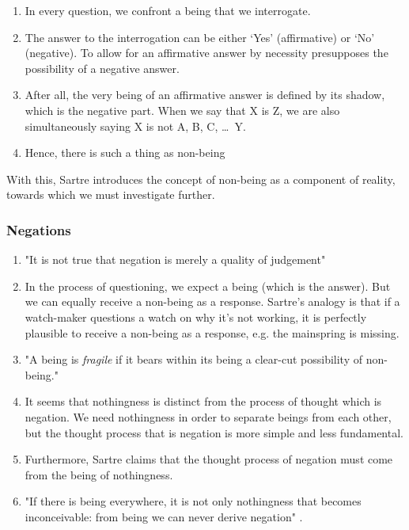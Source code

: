 \begin{enumerate}
  \item In every question, we confront a being that we interrogate.
  \item The answer to the interrogation can be either `Yes' (affirmative) or `No' (negative). To allow for an affirmative answer by necessity presupposes the possibility of a negative answer.
  \item After all, the very being of an affirmative answer is defined by its shadow, which is the negative part. When we say that X is Z, we are also simultaneously saying X is not A, B, C, \ldots\ Y.
  \item Hence, there is such a thing as non-being
\end{enumerate}

\noindent
With this, Sartre introduces the concept of non-being as a component of reality, towards which we must investigate further.

\subsubsection{Negations}

\begin{enumerate}
  \item "It is not true that negation is merely a quality of judgement" \autocite[38]{sartre}
  \item In the process of questioning, we expect a being (which is the answer). But we can equally receive a non-being as a response. Sartre's analogy is that if a watch-maker questions a watch on why it's not working, it is perfectly plausible to receive a non-being as a response, e.g. the mainspring is missing.
  \item "A being is \emph{fragile} if it bears within its being a clear-cut possibility of non-being." \autocite[40]{sartre}
  \item It seems that nothingness is distinct from the process of thought which is negation. We need nothingness in order to separate beings from each other, but the thought process that is negation is more simple and less fundamental.
  \item Furthermore, Sartre claims that the thought process of negation must come from the being of nothingness.
  \item "If there is being everywhere, it is not only nothingness that becomes inconceivable: from being we can never derive negation" \autocite[44]{sartre}.
\end{enumerate}

